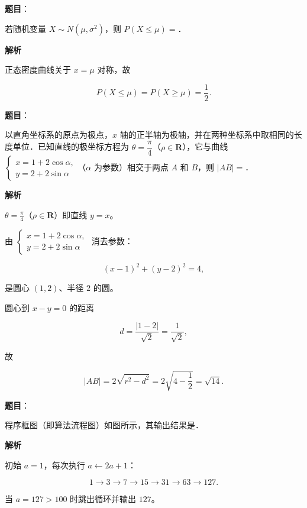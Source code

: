 \begin{answer}

\textbf{题目}：

若随机变量 $X\sim N(\mu,\sigma^2)$，则 $P(X\leqslant\mu)=$\gkblank{}．

\textbf{解析}

正态密度曲线关于 $x=\mu$ 对称，故

\nopagebreak[4]
\[P(X\leqslant\mu)=P(X\geqslant\mu)=\frac12 .\]


\end{answer}
\begin{answer}

\textbf{题目}：

以直角坐标系的原点为极点，$x$ 轴的正半轴为极轴，并在两种坐标系中取相同的长度单位．已知直线的极坐标方程为 $\theta=\dfrac{\pi}{4}$（$\rho\in\mathbf R$），它与曲线 $\begin{cases}x=1+2\cos\alpha,\\ y=2+2\sin\alpha\end{cases}$（$\alpha$ 为参数）相交于两点 $A$ 和 $B$，则 $|AB|=$\gkblank{}．

\textbf{解析}

$\theta=\frac\pi4$（$\rho\in\mathbf R$）即直线 $y=x$。

由 $\begin{cases}x=1+2\cos\alpha,\\ y=2+2\sin\alpha\end{cases}$ 消去参数：

\nopagebreak[4]
\[(x-1)^2+(y-2)^2=4,\]

是圆心 $(1,2)$、半径 $2$ 的圆。

圆心到 $x-y=0$ 的距离

\nopagebreak[4]
\[d=\frac{|1-2|}{\sqrt2}=\frac1{\sqrt2},\]

故

\nopagebreak[4]
\[|AB|=2\sqrt{r^2-d^2}=2\sqrt{4-\frac12}=\sqrt{14}.\]


\end{answer}
\begin{answer}

\textbf{题目}：

程序框图（即算法流程图）如图所示，其输出结果是\gkblank{}．
\nopagebreak[4]
\begin{center}\end{center}
\nopagebreak[4]
\textbf{解析}

初始 $a=1$，每次执行 $a\leftarrow2a+1$：

\nopagebreak[4]
\[1\to3\to7\to15\to31\to63\to127 .\]

当 $a=127>100$ 时跳出循环并输出 $127$。


\end{answer}
